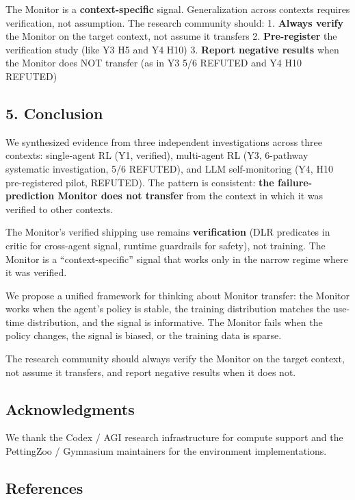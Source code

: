 \documentclass[
]{article}
\begin{document}
The Monitor is a \textbf{context-specific} signal. Generalization across
contexts requires verification, not assumption. The research community
should: 1. \textbf{Always verify} the Monitor on the target context, not
assume it transfers 2. \textbf{Pre-register} the verification study
(like Y3 H5 and Y4 H10) 3. \textbf{Report negative results} when the
Monitor does NOT transfer (as in Y3 5/6 REFUTED and Y4 H10 REFUTED)

\subsection{5. Conclusion}\label{conclusion}

We synthesized evidence from three independent investigations across
three contexts: single-agent RL (Y1, verified), multi-agent RL (Y3,
6-pathway systematic investigation, 5/6 REFUTED), and LLM
self-monitoring (Y4, H10 pre-registered pilot, REFUTED). The pattern is
consistent: \textbf{the failure-prediction Monitor does not transfer}
from the context in which it was verified to other contexts.

The Monitor's verified shipping use remains \textbf{verification} (DLR
predicates in critic for cross-agent signal, runtime guardrails for
safety), not training. The Monitor is a ``context-specific'' signal that
works only in the narrow regime where it was verified.

We propose a unified framework for thinking about Monitor transfer: the
Monitor works when the agent's policy is stable, the training
distribution matches the use-time distribution, and the signal is
informative. The Monitor fails when the policy changes, the signal is
biased, or the training data is sparse.

The research community should always verify the Monitor on the target
context, not assume it transfers, and report negative results when it
does not.

\subsection{Acknowledgments}\label{acknowledgments}

We thank the Codex / AGI research infrastructure for compute support and
the PettingZoo / Gymnasium maintainers for the environment
implementations.

\subsection{References}\label{references}
\end{document}
